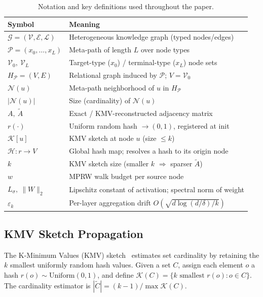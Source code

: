 \documentclass[sigconf]{acmart}
\begin{document}
\begin{table}[t]
\caption{Notation and key definitions used throughout the paper.}
\label{tab:notation}
\centering\scriptsize
\setlength{\tabcolsep}{4pt}
\begin{tabular}{ll}
\toprule
\textbf{Symbol} & \textbf{Meaning} \\
\midrule
$\mathcal{G}=(\mathcal{V},\mathcal{E},\mathcal{L})$ & Heterogeneous knowledge graph (typed nodes/edges) \\
$\mathcal{P}=(x_0,\ldots,x_L)$ & Meta-path of length $L$ over node types \\
$\mathcal{V}_0,\ \mathcal{V}_L$ & Target-type ($x_0$) / terminal-type ($x_L$) node sets \\
$H_\mathcal{P}=(V,E)$ & Relational graph induced by $\mathcal{P}$; $V=\mathcal{V}_0$ \\
$\mathcal{N}(u)$ & Meta-path neighborhood of $u$ in $H_\mathcal{P}$ \\
$|\mathcal{N}(u)|$ & Size (cardinality) of $\mathcal{N}(u)$ \\
$A,\ \widetilde{A}$ & Exact / KMV-reconstructed adjacency matrix \\
$r(\cdot)$ & Uniform random hash $\to (0,1)$, registered at init \\
$\mathcal{K}[u]$ & KMV sketch at node $u$ (size $\leq k$) \\
$\mathcal{H}:r\to V$ & Global hash map; resolves a hash to its origin node \\
$k$ & KMV sketch size (smaller $k$ $\Rightarrow$ sparser $\widetilde{A}$) \\
$w$ & MPRW walk budget per source node \\
$L_\sigma,\ \|W\|_2$ & Lipschitz constant of activation; spectral norm of weight \\
$\varepsilon_k$ & Per-layer aggregation drift $O(\sqrt{d\log(d/\delta)/k})$ \\
\bottomrule
\end{tabular}
\end{table}

\subsection{KMV Sketch Propagation}

The K-Minimum Values (KMV) sketch~\cite{cohen1997size} estimates set cardinality by retaining the $k$ smallest uniformly random hash values.
Given a set $C$, assign each element $o$ a hash $r(o) \sim \text{Uniform}(0,1)$, and define $\mathcal{K}(C) = \{k \text{ smallest } r(o) : o \in C\}$.
The cardinality estimator is $|\widetilde{C}| = (k-1) / \max \mathcal{K}(C)$.
\end{document}
